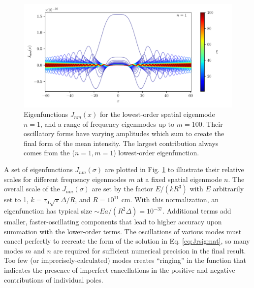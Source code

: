 \documentclass{aastex63}
\begin{document}
\begin{figure}
    \centering
    \includegraphics{Jsoln_n1_m100.pdf}
    \caption{Eigenfunctions $J_{nm}(x)$ for the lowest-order spatial eigenmode $n=1$, and a range of frequency eigenmodes up to $m=100$. Their oscillatory forms have varying amplitudes which sum to create the final form of the mean intensity. The largest contribution always comes from the ($n=1, m=1$) lowest-order eigenfunction.}
    \label{fig:jsoln}
\end{figure}
A set of eigenfunctions $J_{nm}(\sigma)$ are plotted in Fig. \ref{fig:jsoln} to illustrate their relative scales for different frequency eigenmodes $m$ at a fixed spatial eigenmode $n$. The overall scale of the $J_{nm}(\sigma)$ are set by the factor $E/(kR^3)$ with $E$ arbitrarily set to 1, $k = \tau_0 \sqrt{\pi} \Delta / R$, and $R = 10^{11}$ cm. With this normalization, an eigenfunction has typical size ${\sim} E a / \left(R^2 \Delta \right) = 10^{-37}$. Additional terms add smaller, faster-oscillating components that lead to higher accuracy upon summation with the lower-order terms. The oscillations of various modes must cancel perfectly to recreate the form of the solution in Eq. \ref{eq:Jrsigmat}, so many modes $m$ and $n$ are required for sufficient numerical precision in the final result. Too few (or imprecisely-calculated) modes creates ``ringing'' in the function that indicates the presence of imperfect cancellations in the positive and negative contributions of individual poles. 
\end{document}
